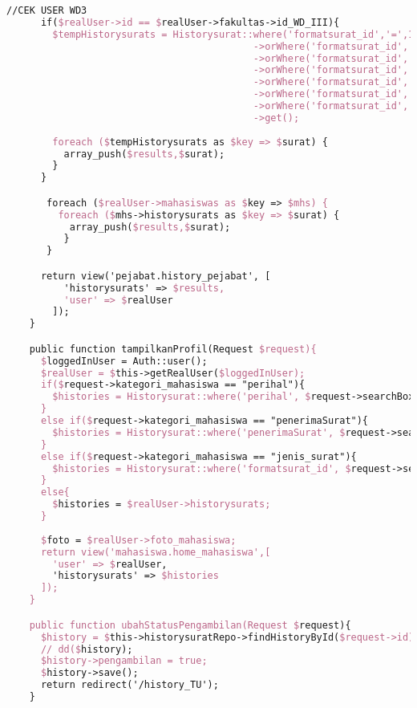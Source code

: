 \begin{lstlisting}[language=tex,basicstyle=\tiny,caption=HistorysuratController.php]
      //CEK USER WD3
      if($realUser->id == $realUser->fakultas->id_WD_III){
        $tempHistorysurats = Historysurat::where('formatsurat_id','=',1)
                                           ->orWhere('formatsurat_id','=',3)
                                           ->orWhere('formatsurat_id','=',4)
                                           ->orWhere('formatsurat_id','=',5)
                                           ->orWhere('formatsurat_id','=',6)
                                           ->orWhere('formatsurat_id','=',7)
                                           ->orWhere('formatsurat_id','=',8)
                                           ->get();
        
        foreach ($tempHistorysurats as $key => $surat) {
          array_push($results,$surat);
        }
      }

       foreach ($realUser->mahasiswas as $key => $mhs) {
         foreach ($mhs->historysurats as $key => $surat) {
           array_push($results,$surat);
          }
       }

      return view('pejabat.history_pejabat', [
          'historysurats' => $results,
          'user' => $realUser
        ]);
  	}

    public function tampilkanProfil(Request $request){
      $loggedInUser = Auth::user();
      $realUser = $this->getRealUser($loggedInUser);
      if($request->kategori_mahasiswa == "perihal"){
        $histories = Historysurat::where('perihal', $request->searchBox)->where('mahasiswa_id', $realUser->id)->get();
      }
      else if($request->kategori_mahasiswa == "penerimaSurat"){
        $histories = Historysurat::where('penerimaSurat', $request->searchBox)->where('mahasiswa_id', $realUser->id)->get();
      }
      else if($request->kategori_mahasiswa == "jenis_surat"){
        $histories = Historysurat::where('formatsurat_id', $request->searchBox)->where('mahasiswa_id', $realUser->id)->get();
      }
      else{
        $histories = $realUser->historysurats;
      }
      
      $foto = $realUser->foto_mahasiswa;
      return view('mahasiswa.home_mahasiswa',[
        'user' => $realUser,
        'historysurats' => $histories
      ]);
    }

    public function ubahStatusPengambilan(Request $request){
      $history = $this->historysuratRepo->findHistoryById($request->id);
      // dd($history);
      $history->pengambilan = true;
      $history->save();
      return redirect('/history_TU');
    }


\end{lstlisting}
